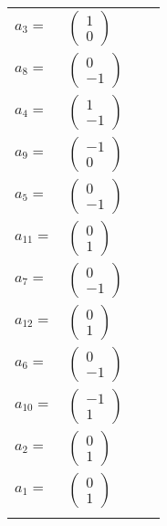 \documentclass[1p]{elsarticle_modified}
\theoremstyle{definition}
\begin{document}
\begin{tabular}{m{7pt} m{180pt} m{7pt} m{180pt} }
\flushright $a_{3}=$&$\begin{pmatrix}1\\0\end{pmatrix}$ \\
\flushright $a_{8}=$&$\begin{pmatrix}0\\-1\end{pmatrix}$ \\
\flushright $a_{4}=$&$\begin{pmatrix}1\\-1\end{pmatrix}$ \\
\flushright $a_{9}=$&$\begin{pmatrix}-1\\0\end{pmatrix}$ \\
\flushright $a_{5}=$&$\begin{pmatrix}0\\-1\end{pmatrix}$ \\
\flushright $a_{11}=$&$\begin{pmatrix}0\\1\end{pmatrix}$ \\
\flushright $a_{7}=$&$\begin{pmatrix}0\\-1\end{pmatrix}$ \\
\flushright $a_{12}=$&$\begin{pmatrix}0\\1\end{pmatrix}$ \\
\flushright $a_{6}=$&$\begin{pmatrix}0\\-1\end{pmatrix}$ \\
\flushright $a_{10}=$&$\begin{pmatrix}-1\\1\end{pmatrix}$ \\
\flushright $a_{2}=$&$\begin{pmatrix}0\\1\end{pmatrix}$ \\
\flushright $a_{1}=$&$\begin{pmatrix}0\\1\end{pmatrix}$\\&\end{tabular}
\end{document}
